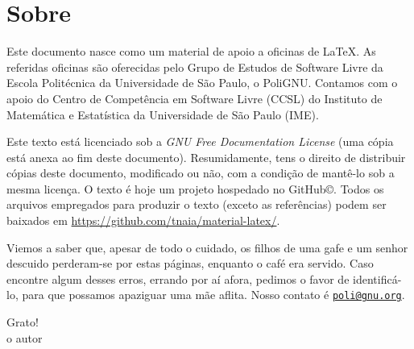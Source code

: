 \section*{Sobre}

Este documento nasce como um material de apoio a oficinas de
\LaTeX. As referidas oficinas são oferecidas pelo Grupo de Estudos de
Software Livre da Escola Politécnica da Universidade de São Paulo, o
PoliGNU. Contamos com o apoio do Centro de Competência em Software
Livre (CCSL) do Instituto de Matemática e Estatística da Universidade
de São Paulo (IME).

Este texto está licenciado sob a \emph{GNU Free
Documentation License} (uma cópia está anexa ao fim deste documento).
Resumidamente, tens o direito de distribuir cópias deste documento,
modificado ou não, com a condição de mantê-lo sob a mesma licença.
O texto é hoje um projeto hospedado no GitHub\copyright. Todos os
arquivos empregados para produzir o texto (exceto as referências)
podem ser baixados em \url{https://github.com/tnaia/material-latex/}.

\vspace*{\fill}

Viemos a saber que, apesar de todo o cuidado, os filhos de uma gafe e
um senhor descuido perderam-se por estas páginas, enquanto o café era
servido. Caso encontre algum desses erros, errando por aí afora,
pedimos o favor de identificá-lo, para que possamos apaziguar uma mãe
aflita. 
Nosso contato é \href{mailto:poli@gnu.org}{\nolinkurl{poli@gnu.org}}.


\begin{flushright}
Grato!\\
o autor
\end{flushright}
\vspace*{\fill}
\clearpage
